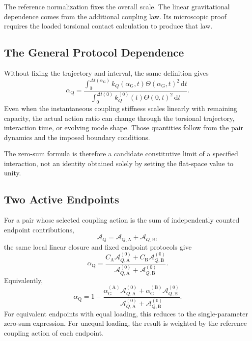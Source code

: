 The reference normalization fixes the overall scale. The linear gravitational dependence comes from the additional coupling law. Its microscopic proof requires the loaded torsional contact calculation to produce that law.

\subsection{The General Protocol Dependence}

Without fixing the trajectory and interval, the same definition gives
\begin{equation}
    \boxed{
    \alpha_{\mathrm Q}
    =\frac{
        \displaystyle
        \int_0^{\Delta t(\alpha_{\mathrm G})}
        k_Q(\alpha_{\mathrm G},t)
        \Theta(\alpha_{\mathrm G},t)^2\,\mathrm dt
    }{
        \displaystyle
        \int_0^{\Delta t(0)}
        k_Q^{(0)}(t)\Theta(0,t)^2\,\mathrm dt
    }
    }.
\end{equation}
Even when the instantaneous coupling stiffness scales linearly with remaining capacity, the actual action ratio can change through the torsional trajectory, interaction time, or evolving mode shape. Those quantities follow from the pair dynamics and the imposed boundary conditions.

The zero-sum formula is therefore a candidate constitutive limit of a specified interaction, not an identity obtained solely by setting the flat-space value to unity.

\subsection{Two Active Endpoints}

For a pair whose selected coupling action is the sum of independently counted endpoint contributions,
\begin{equation}
    \mathcal A_Q=\mathcal A_{Q,\mathrm A}+\mathcal A_{Q,\mathrm B},
\end{equation}
the same local linear closure and fixed endpoint protocols give
\begin{equation}
    \boxed{
    \alpha_{\mathrm Q}
    =\frac{
        C_{\mathrm A}\mathcal A_{Q,\mathrm A}^{(0)}
        +C_{\mathrm B}\mathcal A_{Q,\mathrm B}^{(0)}
    }{
        \mathcal A_{Q,\mathrm A}^{(0)}
        +\mathcal A_{Q,\mathrm B}^{(0)}
    }
    }.
\end{equation}
Equivalently,
\begin{equation}
    \alpha_{\mathrm Q}
    =1-
    \frac{
        \alpha_{\mathrm G}^{(\mathrm A)}\mathcal A_{Q,\mathrm A}^{(0)}
        +\alpha_{\mathrm G}^{(\mathrm B)}\mathcal A_{Q,\mathrm B}^{(0)}
    }{
        \mathcal A_{Q,\mathrm A}^{(0)}
        +\mathcal A_{Q,\mathrm B}^{(0)}
    }.
\end{equation}
For equivalent endpoints with equal loading, this reduces to the single-parameter zero-sum expression. For unequal loading, the result is weighted by the reference coupling action of each endpoint.

